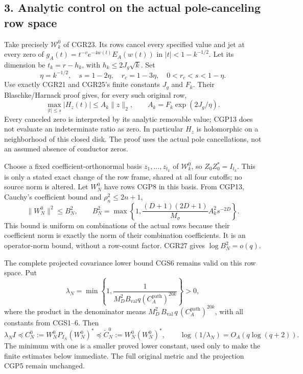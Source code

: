 \documentclass[11pt]{article}
\begin{document}
\subsection{3. Analytic control on the actual pole-canceling row space}\label{analytic-control-on-the-actual-pole-canceling-row-space}

Take precisely \(\mathcal W_k^0\) of CGR23. Its rows cancel every specified value and jet at every zero of \(g_A(t)=t^{-v}e^{-4w(t)}E_A(w(t))\) in \(|t|<1-k^{-1/2}\). Let its dimension be \(t_k=r-h_k\), with \(h_k\le2J_g\sqrt k\). Set \[
\eta=k^{-1/2},\quad s=1-2\eta,\quad r_c=1-3\eta,
\quad 0<r_c<s<1-\eta.
\tag{CGP12}
\] Use exactly CGR21 and CGR25's finite constants \(J_g\) and \(F_k\). Their Blaschke/Harnack proof gives, for every such original row, \[
\max_{|t|\le s}|H_z(t)|\le A_k\|z\|_2,
\qquad A_k=F_k\exp(2J_g/\eta).
\tag{CGP13}
\] Every canceled zero is interpreted by its analytic removable value; CGP13 does not evaluate an indeterminate ratio as zero. In particular \(H_z\) is holomorphic on a neighborhood of this closed disk. The proof uses the actual pole cancellations, not an assumed absence of conductor zeros.

Choose a fixed coefficient-orthonormal basis \(z_1,\ldots,z_{t_k}\) of \(\mathcal W_k^0\), so \(Z_0Z_0^*=I_{t_k}\). This is only a stated exact change of the row frame, shared at all four cutoffs; no source norm is altered. Let \(W_N^0\) have rows CGP8 in this basis. From CGP13, Cauchy's coefficient bound and \(\rho_n^2\le2n+1\), \[
\|W_N^0\|^2\le B_N^2,
\qquad
B_N^2=\max\left\{1,
\frac{(D+1)(2D+1)}{M_\sigma}A_k^2s^{-2D}\right\}.
\tag{CGP14}
\] This bound is uniform on combinations of the actual rows because their coefficient norm is exactly the norm of their combination coefficients. It is an operator-norm bound, without a row-count factor. CGR27 gives \(\log B_N^2=o(q)\).

The complete projected covariance lower bound CGS6 remains valid on this row space. Put \[
\lambda_N=\min\left\{1,
\frac1{M_D^2B_{\mathrm{val}}q
(C_A^{\mathrm{path}})^{20k}}\right\}>0,
\tag{CGP15}
\] where the product in the denominator means \(M_D^2\,B_{\mathrm{val}}\,q\,(C_A^{\mathrm{path}})^{20k}\), with all constants from CGS1--6. Then \[
\lambda_N I\preceq C_N^0:=W_N^0P_{I_N}(W_N^0)^*
\preceq\widetilde C_N^0:=W_N^0(W_N^0)^*,\qquad
\log(1/\lambda_N)=O_A(q\log(q+2)).
\tag{CGP16}
\] The minimum with one is a smaller proved lower constant, used only to make the finite estimates below immediate. The full original metric and the projection CGP5 remain unchanged.
\end{document}
